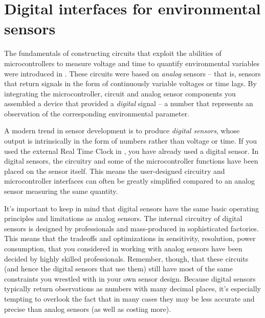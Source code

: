 \setchapterpreamble[u]{\margintoc}
\chapter{Digital interfaces for environmental sensors}

The fundamentals of constructing circuits that exploit the abilities of microcontrollers to measure voltage and time to quantify environmental variables were introduced in . 
These circuits were based on \textit{analog} sensors -- that is, sensors that return signals in the form of continuously variable voltages or time lags. 
By integrating the microcontroller, circuit and analog sensor components you assembled a device that provided a \textit{digital} signal -- a number that represents an observation of the corresponding environmental parameter.

A modern trend in sensor development is to produce \textit{digital sensors}, whose output is intrinsically in the form of numbers rather than voltage or time.
If you used the external  Real Time Clock in , you have already used a digital sensor. 
In digital sensors, the circuitry and some of the microcontroller functions have been placed on the sensor itself.
This means the user-designed circuitry and microcontroller interfaces can often be greatly simplified compared to an analog sensor measuring the same quantity.

It's important to keep in mind that digital sensors have the same basic operating principles and limitations as analog sensors.
The internal circuitry of digital sensors is designed by professionals and mass-produced in sophisticated factories.
This means that the tradeoffs and optimizations in sensitivity, resolution, power consumption, \etc that you considered in working with analog sensors have been decided by highly skilled professionals.
Remember, though, that these circuits (and hence the digital sensors that use them) still have most of the same constraints you wrestled with in your own sensor design.
Because digital sensors typically return observations as numbers with many decimal places, it's especially tempting to overlook the fact that in many cases they may be less accurate and precise than analog sensors (as well as costing more). 

